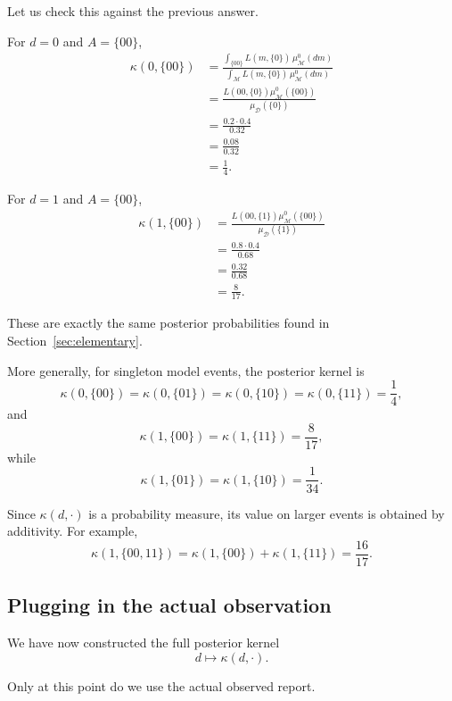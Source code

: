 \documentclass[11pt]{article}
\newcommand{\M}{\mathcal{M}}
\newcommand{\D}{\mathcal{D}}
\newcommand{\muMzero}{\mu^0_{\M}}
\newcommand{\muD}{\mu_{\D}}
\begin{document}
Let us check this against the previous answer.

For \(d=0\) and \(A=\{00\}\),
\[
\begin{aligned}
    \kappa(0,\{00\})
    &=
    \frac{
        \int_{\{00\}} L(m,\{0\})\,\muMzero(dm)
    }{
        \int_{\M} L(m,\{0\})\,\muMzero(dm)
    }
    \\
    &=
    \frac{
        L(00,\{0\})\muMzero(\{00\})
    }{
        \muD(\{0\})
    }
    \\
    &=
    \frac{
        0.2\cdot 0.4
    }{
        0.32
    }
    \\
    &=
    \frac{0.08}{0.32}
    \\
    &=
    \frac{1}{4}.
\end{aligned}
\]

For \(d=1\) and \(A=\{00\}\),
\[
\begin{aligned}
    \kappa(1,\{00\})
    &=
    \frac{
        L(00,\{1\})\muMzero(\{00\})
    }{
        \muD(\{1\})
    }
    \\
    &=
    \frac{
        0.8\cdot 0.4
    }{
        0.68
    }
    \\
    &=
    \frac{0.32}{0.68}
    \\
    &=
    \frac{8}{17}.
\end{aligned}
\]

These are exactly the same posterior probabilities found in Section~\ref{sec:elementary}.

More generally, for singleton model events, the posterior kernel is
\[
    \kappa(0,\{00\})
    =
    \kappa(0,\{01\})
    =
    \kappa(0,\{10\})
    =
    \kappa(0,\{11\})
    =
    \frac{1}{4},
\]
and
\[
    \kappa(1,\{00\})
    =
    \kappa(1,\{11\})
    =
    \frac{8}{17},
\]
while
\[
    \kappa(1,\{01\})
    =
    \kappa(1,\{10\})
    =
    \frac{1}{34}.
\]

Since \(\kappa(d,\cdot)\) is a probability measure, its value on larger events is obtained by additivity. For example,
\[
    \kappa(1,\{00,11\})
    =
    \kappa(1,\{00\})
    +
    \kappa(1,\{11\})
    =
    \frac{16}{17}.
\]

\subsection{Plugging in the actual observation}

We have now constructed the full posterior kernel
\[
    d\longmapsto \kappa(d,\cdot).
\]

Only at this point do we use the actual observed report.
\end{document}
